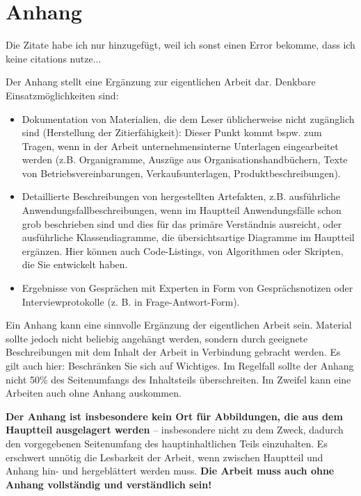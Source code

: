\chapter{Anhang}
\label{chap:ein-anhang}

{ \color{red} Die Zitate habe ich nur hinzugefügt, weil ich sonst einen Error bekomme, dass ich keine citations nutze... }
\cite{FHDWModulhabdbuchBachelor,FHDWModulhabdbuchMasterInformationEngineering}

Der Anhang stellt eine Ergänzung zur eigentlichen Arbeit dar. Denkbare Einsatzmöglichkeiten sind:

\begin{itemize}
    \item Dokumentation von Materialien, die dem Leser üblicherweise nicht zugänglich sind (Herstellung der Zitierfähigkeit): Dieser Punkt kommt bspw. zum Tragen, wenn in der Arbeit unternehmensinterne Unterlagen eingearbeitet werden (z.B. Organigramme, Auszüge aus Organisationshandbüchern, Texte von Betriebsvereinbarungen, Verkaufsunterlagen, Produktbeschreibungen).
    \item Detaillierte Beschreibungen von hergestellten Artefakten, z.B. ausführliche Anwendungsfallbeschreibungen, wenn im Hauptteil Anwendungsfälle schon grob beschrieben sind und dies für das primäre Verständnis ausreicht, oder ausführliche Klassendiagramme, die übersichtsartige Diagramme im Hauptteil ergänzen. Hier können auch Code-Listings, von Algorithmen oder Skripten, die Sie entwickelt haben.
    \item Ergebnisse von Gesprächen mit Experten in Form von Gesprächsnotizen oder  Interviewprotokolle (z. B. in Frage-Antwort-Form).
\end{itemize}


Ein Anhang kann eine sinnvolle Ergänzung der eigentlichen Arbeit sein. Material sollte jedoch nicht beliebig angehängt werden, sondern durch geeignete Beschreibungen mit dem Inhalt der Arbeit in Verbindung gebracht werden. Es gilt auch hier: Beschränken Sie sich auf Wichtiges. Im Regelfall sollte der Anhang nicht 50\% des Seitenumfangs des Inhaltsteils überschreiten. Im Zweifel kann eine Arbeiten auch ohne Anhang auskommen.

\textbf{Der Anhang ist insbesondere kein Ort für Abbildungen, die aus dem Hauptteil ausgelagert werden} -- insbesondere nicht zu dem Zweck, dadurch den vorgegebenen Seitenumfang des hauptinhaltlichen Teils einzuhalten. Es erschwert unnötig die Lesbarkeit der Arbeit, wenn zwischen Hauptteil und Anhang hin- und hergeblättert werden muss. \textbf{Die Arbeit muss auch ohne Anhang vollständig und verständlich sein!}
